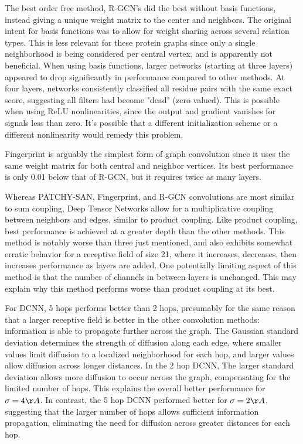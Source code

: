 The best order free method, R-GCN's did the best without basis functions, instead giving a unique weight matrix to the center and neighbors.
The original intent for basis functions was to allow for weight sharing across several relation types.
This is less relevant for these protein graphs since only a single neighborhood is being considered per central vertex, and is apparently not beneficial. 
When using basis functions, larger networks (starting at three layers) appeared to drop significantly in performance compared to other methods.
At four layers, networks consistently classified all residue pairs with the same exact score, suggesting all filters had become "dead" (zero valued).
This is possible when using ReLU nonlinearities, since the output and gradient vanishes for signals less than zero.
It's possible that a different initialization scheme or a different nonlinearity would remedy this problem.

Fingerprint is arguably the simplest form of graph convolution since it uses the same weight matrix for both central and neighbor vertices.
Its best performance is only 0.01 below that of R-GCN, but it requires twice as many layers.

Whereas PATCHY-SAN, Fingerprint, and R-GCN convolutions are most similar to sum coupling, Deep Tensor Networks allow for a multiplicative coupling between neighbors and edges, similar to product coupling.
Like product coupling, best performance is achieved at a greater depth than the other methods.
This method is notably worse than three just mentioned, and also exhibits somewhat erratic behavior for a receptive field of size 21, where it increases, decreases, then increases performance as layers are added. 
One potentially limiting aspect of this method is that the number of channels in between layers is unchanged.
This may explain why this method performs worse than product coupling at its best.


For DCNN, 5 hops performs better than 2 hops, presumably for the same reason that a larger receptive field is better in the other convolution methods: information is able to propagate further across the graph.
The Gaussian standard deviation determines the strength of diffusion along each edge, where smaller values limit diffusion to a localized neighborhood for each hop, and larger values allow diffusion across longer distances.
In the 2 hop DCNN, The larger standard deviation allows more diffusion to occur across the graph, compensating for the limited number of hops.
This explains the overall better performance for $\sigma=4\AA{}$.
In contrast, the 5 hop DCNN performed better for $\sigma=2\AA{}$, suggesting that the larger number of hops allows sufficient information propagation, eliminating the need for diffusion across greater distances for each hop.


